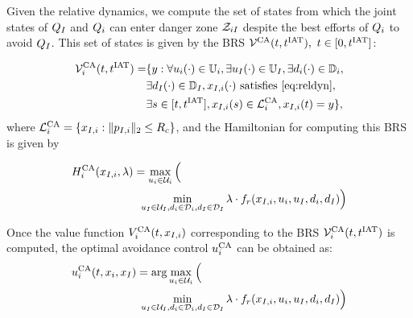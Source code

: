 Given the relative dynamics, we compute the set of states from which the joint states of $Q_{I}$ and $Q_i$ can enter danger zone $\mathcal{Z}_{iI}$ despite the best efforts of $Q_i$ to avoid $Q_{I}$. This set of states is given by the BRS $\mathcal{V}^{\text{CA}}(t, t^\text{IAT}),~ t \in [0, t^\text{IAT}]$:%

\begin{equation} \label{eqn:optAvoid}
\begin{aligned}
\brs^{\text{CA}}_{i}(t, \iat) = & \{y: \forall \ctrl_i(\cdot) \in \cfset_i, \exists \ctrl_\intr(\cdot) \in \cfset_\intr, \exists \dstb_i(\cdot) \in \dfset_i, \\
& \exists \dstb_\intr(\cdot) \in \dfset_\intr, \state_{\intr, i}(\cdot) \text{ satisfies \eqref{eq:reldyn}},\\
& \exists s \in [t, \iat], \state_{\intr, i}(s) \in \targetset^{\text{CA}}_{i}, \state_{\intr, i}(t) = y\},
\end{aligned}
\end{equation}
where $\mathcal{L}^{\text{CA}}_{i} = \{x_{I, i}: \|p_{I, i}\|_2 \le R_c\}$, and the Hamiltonian for computing this BRS is given by

\begin{equation*}
\begin{aligned}
&H^{\text{CA}}_{i}(x_{I, i}, \lambda) = \max_{u_i \in \mathcal{U}_i} \Big( \\
&\qquad \qquad \qquad \min_{u_I \in \mathcal{U}_I, d_i \in \mathcal{D}_i, d_I \in \mathcal{D}_I} \lambda \cdot f_r(x_{I, i}, u_i, u_I, d_i, d_I) \Big)
\end{aligned}
\end{equation*}

Once the value function $V^{\text{CA}}_{i}(t, x_{I, i})$ corresponding to the BRS $\mathcal{V}^{\text{CA}}_{i}(t, t^\text{IAT})$ is computed, the optimal avoidance control ${u^{\text{CA}}_{i}}$ can be obtained as:
\begin{equation} \label{eqn:optAvoidCtrl}
\begin{aligned}
&{\ctrl^{\text{CA}}_{i}}(t, \state_i, \state_\intr)  = \arg \max_{\ctrl_i \in \cset_i} \Big( \\
&\qquad \qquad \qquad \min_{\ctrl_\intr \in \cset_\intr, \dstb_i \in \dset_i, \dstb_\intr \in \dset_\intr} \costate \cdot f_r(\state_{\intr, i}, \ctrl_i, \ctrl_\intr, \dstb_i, \dstb_\intr) \Big)
\end{aligned}
\end{equation}

